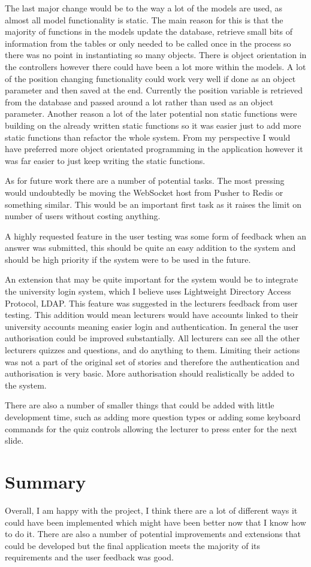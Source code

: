 The last major change would be to the way a lot of the models are used, as almost all model functionality is static. The main reason for this is that the majority of functions in the models update the database, retrieve small bits of information from the tables or only needed to be called once in the process so there was no point in instantiating so many objects. There is object orientation in the controllers however there could have been a lot more within the models. A lot of the position changing functionality could work very well if done as an object parameter and then saved at the end. Currently the position variable is retrieved from the database and passed around a lot rather than used as an object parameter. Another reason a lot of the later potential non static functions were building on the already written static functions so it was easier just to add more static functions than refactor the whole system. From my perspective I would have preferred more object orientated programming in the application however it was far easier to just keep writing the static functions.

As for future work there are a number of potential tasks. The most pressing would undoubtedly be moving the WebSocket host from Pusher to Redis or something similar. This would be an important first task as it raises the limit on number of users without costing anything. 

A highly requested feature in the user testing was some form of feedback when an answer was submitted, this should be quite an easy addition to the system and should be high priority if the system were to be used in the future.

An extension that may be quite important for the system would be to integrate the university login system, which I believe uses Lightweight Directory Access Protocol, LDAP. This feature was suggested in the lecturers feedback from user testing. This addition would mean lecturers would have accounts linked to their university accounts meaning easier login and authentication. In general the user authorisation could be improved substantially. All lecturers can see all the other lecturers quizzes and questions, and do anything to them. Limiting their actions was not a part of the original set of stories and therefore the authentication and authorisation is very basic. More authorisation should realistically be added to the system.

There are also a number of smaller things that could be added with little development time, such as adding more question types or adding some keyboard commands for the quiz controls allowing the lecturer to press enter for the next slide.

\section{Summary}
Overall, I am happy with the project, I think there are a lot of different ways it could have been implemented which might have been better now that I know how to do it. There are also a number of potential improvements and extensions that could be developed but the final application meets the majority of its requirements and the user feedback was good.